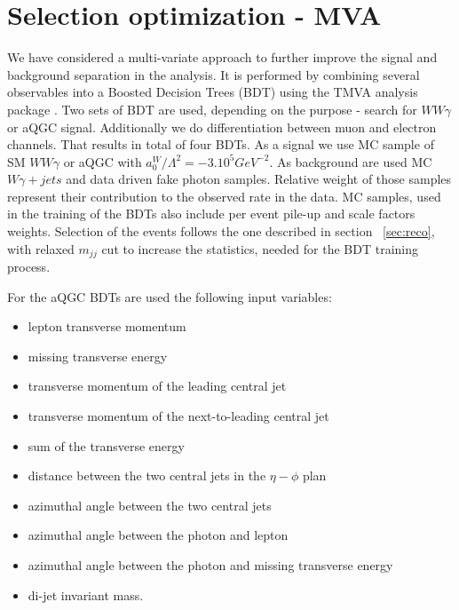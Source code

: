 \clearpage{}
\section{Selection optimization - MVA}
\label{sec:MVA}

We have considered a multi-variate approach to further improve the signal and background separation in the analysis. It is performed by combining several observables into a Boosted Decision 
Trees (BDT) using the TMVA analysis package \cite{TMVA}. Two sets of BDT are used, depending on the purpose - search for $WW\gamma$ or aQGC signal. Additionally we do 
differentiation between muon and electron channels. That results in total of four BDTs. As a signal we use MC sample of SM $WW\gamma$ or aQGC with 
$a_{0}^{W}/\Lambda^{2}=-3.10^{5} GeV^{-2}$. As background are used MC $W\gamma+jets$ and data driven fake photon samples. Relative weight of those samples represent their 
contribution to the observed rate in the data. MC samples, used in the training of the BDTs also include per event pile-up and scale factors weights. Selection of the events 
follows the one described in section ~\ref{sec:reco}, with relaxed $m_{jj}$ cut to increase the statistics, needed for the BDT training process.

For the aQGC BDTs are used the following input variables:
\begin{itemize}
\item lepton transverse momentum 
\item missing transverse energy
\item transverse momentum of the leading central jet
\item transverse momentum of the next-to-leading central jet
\item sum of the transverse energy
\item distance between the two central jets in the $\eta-\phi$ plan
\item azimuthal angle between the two central jets
\item azimuthal angle between the photon and lepton
\item azimuthal angle between the photon and missing transverse energy
\item di-jet invariant mass.
\end{itemize}

